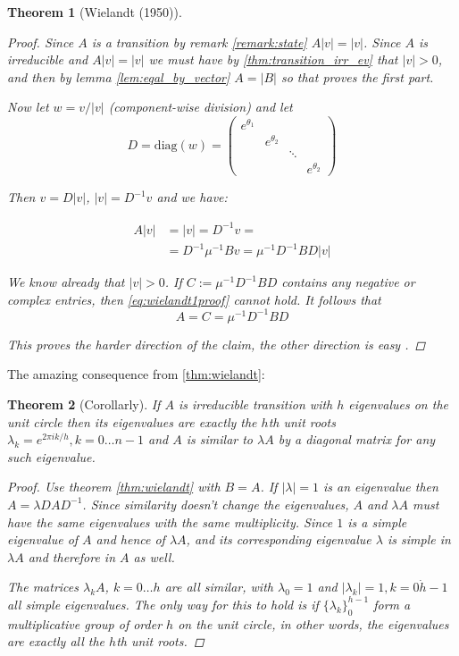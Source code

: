 \documentclass[a4paper,10pt]{article}
\newcommand{\gt}{>}
\theoremstyle{definition}
\theoremstyle{remark}
\theoremstyle{plain}
\newtheorem{thm}{Theorem}[section]
\begin{document}
\begin{thm}[Wielandt (1950)]
\begin{proof}
Since $A$ is a transition by remark \ref{remark:state} $A|v|=|v|$. Since $A$ is
irreducible and $A|v| = |v|$ we must have by \ref{thm:transition_irr_ev} that
$|v| \gt 0$, and then by
lemma \ref{lem:eqal_by_vector} $A = |B|$ so that proves the first part.  

Now let $w = v / |v|$ (component-wise division) and let 
\[D = \text{diag}(w) = 
\begin{pmatrix}
e^{\theta_1} & & & \\
& e^{\theta_2} & & \\
& & \ddots & \\
& & & e^{\theta_2}
\end{pmatrix}
\]

Then $v = D|v|$, $|v|=D^{-1}v$ and we have:

\begin{equation}
\label{eq:wielandt1proof}
\begin{aligned}
A|v| &= |v| = D^{-1}v = \\
&= D^{-1} \mu^{-1} B v = \mu^{-1} D^{-1} BD|v|
\end{aligned}
\end{equation}

We know already that $|v| \gt 0$. If 
$C := \mu^{-1} D^{-1} BD$ contains any negative or complex entries, then
\ref{eq:wielandt1proof} cannot hold. It follows that
\[
A = C = \mu^{-1} D^{-1} BD 
\]

This proves the harder direction of the claim, the other direction is easy \qedsymbol.

\end{proof}
\end{thm}

The amazing consequence from \ref{thm:wielandt}:

\begin{thm}[Corollarly]
\label{thm:wielandt2}
If $A$ is irreducible transition with $h$ 
eigenvalues on the unit circle then its eigenvalues are exactly the $h$th unit roots
$\lambda_k = e^{2 \pi i k /h}, k = 0 \dots n-1$ and $A$ is similar to $\lambda
A$ by a diagonal matrix for any such eigenvalue.

\begin{proof}
Use theorem \ref{thm:wielandt} with $B=A$. If $|\lambda|=1$ is an eigenvalue
then $A = \lambda D A D^{-1}$. Since similarity doesn't change the eigenvalues,
$A$ and $\lambda A$ must have the same eigenvalues with the same multiplicity.
Since $1$ is a simple eigenvalue of $A$ and hence of $\lambda A$, and its
corresponding eigenvalue $\lambda$ is simple in $\lambda A$ and therefore in $A$
as well.

The matrices $\lambda_k A$, $k=0 \dots h$ are all similar, with $\lambda_0 = 1$
and $|\lambda_k| = 1, k=0 \dot h-1$ all simple eigenvalues. The only way for this to hold is if
$\{\lambda_k\}_0^{h-1}$ form a multiplicative group of order $h$ on the unit
circle, in other words, the eigenvalues are exactly all the $h$th unit roots. 
\end{proof}
\end{thm}
\end{document}
